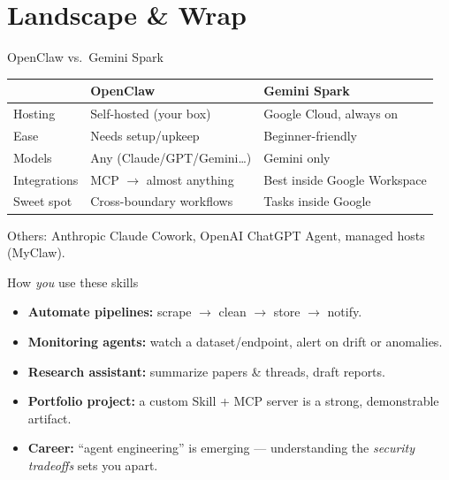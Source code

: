 \documentclass[aspectratio=169,11pt]{beamer}
\begin{document}
\section{Landscape \& Wrap}

\begin{frame}{OpenClaw vs.\ Gemini Spark}
  \centering
  \renewcommand{\arraystretch}{1.25}
  \begin{tabular}{l l l}
    \toprule
     & \textbf{OpenClaw} & \textbf{Gemini Spark} \\
    \midrule
    Hosting & Self-hosted (your box) & Google Cloud, always on \\
    Ease & Needs setup/upkeep & Beginner-friendly \\
    Models & Any (Claude/GPT/Gemini\ldots) & Gemini only \\
    Integrations & MCP $\to$ almost anything & Best inside Google Workspace \\
    Sweet spot & Cross-boundary workflows & Tasks inside Google \\
    \bottomrule
  \end{tabular}
  \vspace{0.7em}
  \begin{center}\scriptsize Others: Anthropic Claude Cowork, OpenAI ChatGPT Agent, managed hosts (MyClaw).\end{center}
\end{frame}

\begin{frame}{How \emph{you} use these skills}
  \begin{itemize}
    \item \textbf{Automate pipelines:} scrape $\to$ clean $\to$ store $\to$ notify.
    \item \textbf{Monitoring agents:} watch a dataset/endpoint, alert on drift or anomalies.
    \item \textbf{Research assistant:} summarize papers \& threads, draft reports.
    \item \textbf{Portfolio project:} a custom Skill + MCP server is a strong, demonstrable artifact.
    \item \textbf{Career:} ``agent engineering'' is emerging — understanding the \emph{security tradeoffs} sets you apart.
  \end{itemize}
\end{frame}
\end{document}
